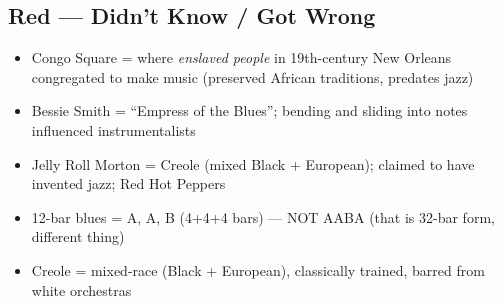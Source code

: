\documentclass[11pt, letterpaper]{article}
\begin{document}
\subsection*{\textcolor{redzone}{Red --- Didn't Know / Got Wrong}}
\begin{itemize}[label=$\square$]
    \item Congo Square = where \textit{enslaved people} in 19th-century New Orleans congregated to make music (preserved African traditions, predates jazz)
    \item Bessie Smith = ``Empress of the Blues''; bending and sliding into notes influenced instrumentalists
    \item Jelly Roll Morton = Creole (mixed Black + European); claimed to have invented jazz; Red Hot Peppers
    \item 12-bar blues = A, A, B (4+4+4 bars) --- NOT AABA (that is 32-bar form, different thing)
    \item Creole = mixed-race (Black + European), classically trained, barred from white orchestras
\end{itemize}
\end{document}

